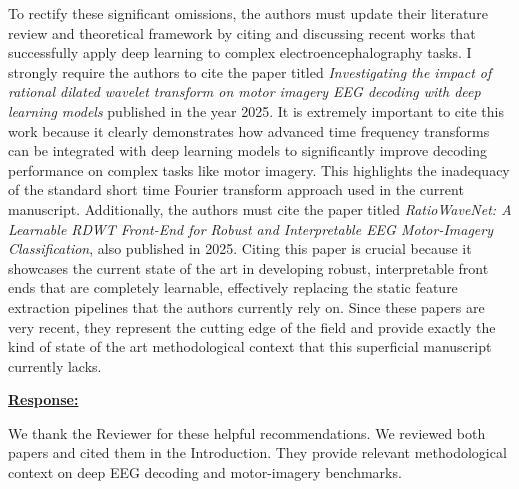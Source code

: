 \documentclass{article}
\begin{document}
\begin{cmt}{}{}

To rectify these significant omissions, the authors must update their literature
review and theoretical framework by citing and discussing recent works that
successfully apply deep learning to complex electroencephalography tasks. I
strongly require the authors to cite the paper titled \textit{Investigating the
impact of rational dilated wavelet transform on motor imagery EEG decoding with
deep learning models} published in the year 2025. It is extremely important to
cite this work because it clearly demonstrates how advanced time frequency
transforms can be integrated with deep learning models to significantly improve
decoding performance on complex tasks like motor imagery. This highlights the
inadequacy of the standard short time Fourier transform approach used in the
current manuscript. Additionally, the authors must cite the paper titled
\textit{RatioWaveNet: A Learnable RDWT Front-End for Robust and Interpretable
EEG Motor-Imagery Classification}, also published in 2025. Citing this paper is
crucial because it showcases the current state of the art in developing robust,
interpretable front ends that are completely learnable, effectively replacing
the static feature extraction pipelines that the authors currently rely on.
Since these papers are very recent, they represent the cutting edge of the field
and provide exactly the kind of state of the art methodological context that
this superficial manuscript currently lacks.

\end{cmt}
\vspace{0.1cm}
\noindent
\underline{\textbf{Response:}}
\vspace{0.2cm}

We thank the Reviewer for these helpful recommendations. We reviewed both
papers and cited them in the Introduction. They provide relevant methodological
context on deep EEG decoding and motor-imagery benchmarks.

\vspace{0.3cm}
\end{document}
